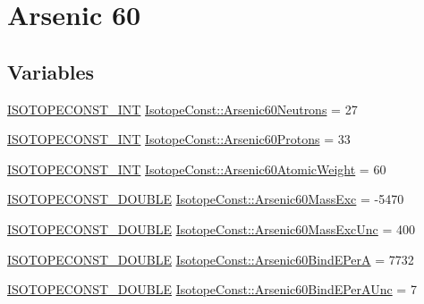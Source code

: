 \hypertarget{group___isotope_const-_arsenic-_as60}{}\section{Arsenic 60}
\label{group___isotope_const-_arsenic-_as60}
\subsection*{Variables}
\begin{DoxyCompactItemize}
\item 
\mbox{\hyperlink{group___isotope_const-_macros_ga5f18360b3e99483a35c32d789e62621c}{I\+S\+O\+T\+O\+P\+E\+C\+O\+N\+S\+T\+\_\+\+I\+NT}} \mbox{\hyperlink{group___isotope_const-_arsenic-_as60_ga955dc98d6e2c5550a541ae96854e94cd}{Isotope\+Const\+::\+Arsenic60\+Neutrons}} = 27
\item 
\mbox{\hyperlink{group___isotope_const-_macros_ga5f18360b3e99483a35c32d789e62621c}{I\+S\+O\+T\+O\+P\+E\+C\+O\+N\+S\+T\+\_\+\+I\+NT}} \mbox{\hyperlink{group___isotope_const-_arsenic-_as60_gac1a0fa1e35933873bb95dacb6031602b}{Isotope\+Const\+::\+Arsenic60\+Protons}} = 33
\item 
\mbox{\hyperlink{group___isotope_const-_macros_ga5f18360b3e99483a35c32d789e62621c}{I\+S\+O\+T\+O\+P\+E\+C\+O\+N\+S\+T\+\_\+\+I\+NT}} \mbox{\hyperlink{group___isotope_const-_arsenic-_as60_ga090575b6603decf876b9f0e8fcf0f089}{Isotope\+Const\+::\+Arsenic60\+Atomic\+Weight}} = 60
\item 
\mbox{\hyperlink{group___isotope_const-_macros_ga8f45a7272ce02c0b4c65c44636ed719a}{I\+S\+O\+T\+O\+P\+E\+C\+O\+N\+S\+T\+\_\+\+D\+O\+U\+B\+LE}} \mbox{\hyperlink{group___isotope_const-_arsenic-_as60_ga85382c59f42ae5726823870f111c7414}{Isotope\+Const\+::\+Arsenic60\+Mass\+Exc}} = -\/5470
\item 
\mbox{\hyperlink{group___isotope_const-_macros_ga8f45a7272ce02c0b4c65c44636ed719a}{I\+S\+O\+T\+O\+P\+E\+C\+O\+N\+S\+T\+\_\+\+D\+O\+U\+B\+LE}} \mbox{\hyperlink{group___isotope_const-_arsenic-_as60_gadd5e9fce4a1bccad39c5385c294d51a0}{Isotope\+Const\+::\+Arsenic60\+Mass\+Exc\+Unc}} = 400
\item 
\mbox{\hyperlink{group___isotope_const-_macros_ga8f45a7272ce02c0b4c65c44636ed719a}{I\+S\+O\+T\+O\+P\+E\+C\+O\+N\+S\+T\+\_\+\+D\+O\+U\+B\+LE}} \mbox{\hyperlink{group___isotope_const-_arsenic-_as60_ga3766a18da870d2fd6233bf0477d74d11}{Isotope\+Const\+::\+Arsenic60\+Bind\+E\+PerA}} = 7732
\item 
\mbox{\hyperlink{group___isotope_const-_macros_ga8f45a7272ce02c0b4c65c44636ed719a}{I\+S\+O\+T\+O\+P\+E\+C\+O\+N\+S\+T\+\_\+\+D\+O\+U\+B\+LE}} \mbox{\hyperlink{group___isotope_const-_arsenic-_as60_ga2b884e6b37054e3b24afc6381b545f36}{Isotope\+Const\+::\+Arsenic60\+Bind\+E\+Per\+A\+Unc}} = 7

\end{DoxyCompactItemize}
